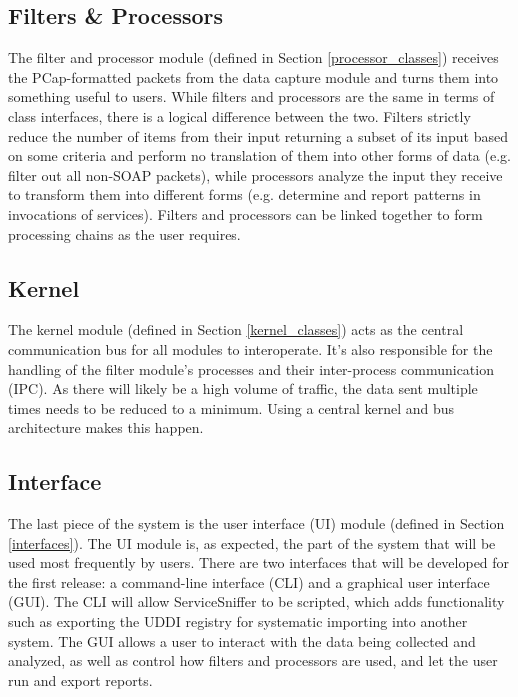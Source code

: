 \documentclass[titlepage]{article}
\begin{document}
\subsection{Filters \& Processors}

The filter and processor module (defined in Section \ref{processor_classes})
receives the PCap-formatted packets from the data capture module and turns them
into something useful to users.  While filters and processors are the same in
terms of class interfaces, there is a logical difference between the two.
Filters strictly reduce the number of items from their input returning a subset
of its input based on some criteria and perform no translation of them into
other forms of data (e.g.  filter out all non-SOAP packets), while processors
analyze the input they receive to transform them into different forms (e.g.
determine and report patterns in invocations of services).  Filters and
processors can be linked together to form processing chains as the user
requires.

\subsection{Kernel}

The kernel module (defined in Section \ref{kernel_classes}) acts as the central
communication bus for all modules to interoperate.  It's also responsible for
the handling of the filter module's processes and their inter-process
communication (IPC).  As there will likely be a high volume of traffic, the
data sent multiple times needs to be reduced to a minimum.  Using a central
kernel and bus architecture makes this happen.

\subsection{Interface}

The last piece of the system is the user interface (UI) module (defined in
Section \ref{interfaces}).  The UI module is, as expected, the part of the
system that will be used most frequently by users.  There are two interfaces
that will be developed for the first release: a command-line interface (CLI)
and a graphical user interface (GUI).  The CLI will allow ServiceSniffer to be
scripted, which adds functionality such as exporting the UDDI registry for
systematic importing into another system.  The GUI allows a user to interact
with the data being collected and analyzed, as well as control how filters and
processors are used, and let the user run and export reports.
\end{document}
